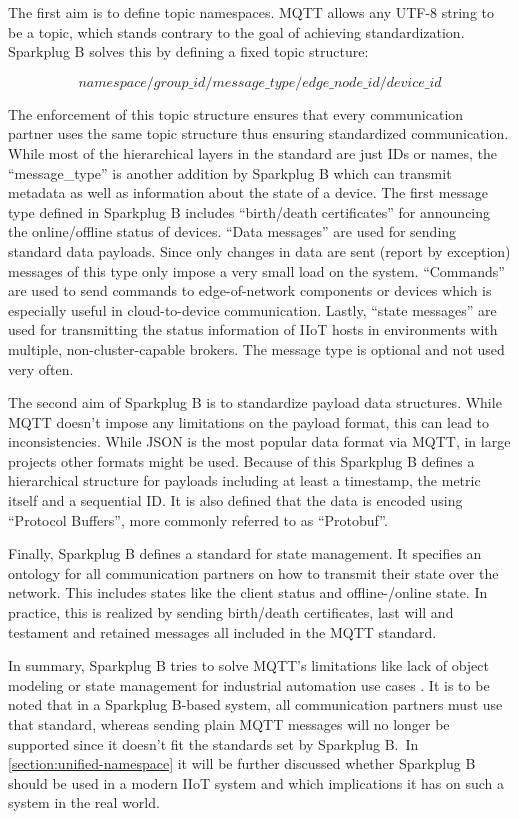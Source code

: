         The first aim is to define topic namespaces. MQTT allows any UTF-8 string to be a topic, which stands contrary to the goal of achieving standardization. Sparkplug B solves this by defining a fixed topic structure:
        
        \[
            namespace/group\_id/message\_type/edge\_node\_id/device\_id
        \]
            
        \noindent The enforcement of this topic structure ensures that every communication partner uses the same topic structure thus ensuring standardized communication. While most of the hierarchical layers in the standard are just IDs or names, the ``message\_type'' is another addition by Sparkplug B which can transmit metadata as well as information about the state of a device. The first message type defined in Sparkplug B includes ``birth/death certificates'' for announcing the online/offline status of devices. ``Data messages'' are used for sending standard data payloads. Since only changes in data are sent (report by exception) messages of this type only impose a very small load on the system. ``Commands'' are used to send commands to edge-of-network components or devices which is especially useful in cloud-to-device communication. Lastly, ``state messages'' are used for transmitting the status information of IIoT hosts in environments with multiple, non-cluster-capable brokers. The message type is optional and not used very often. 
        
        The second aim of Sparkplug B is to standardize payload data structures. While MQTT doesn't impose any limitations on the payload format, this can lead to inconsistencies. While JSON is the most popular data format via MQTT, in large projects other formats might be used. Because of this Sparkplug B defines a hierarchical structure for payloads including at least a timestamp, the metric itself and a sequential ID. It is also defined that the data is encoded using ``Protocol Buffers'', more commonly referred to as ``Protobuf''.
        
        Finally, Sparkplug B defines a standard for state management. It specifies an ontology for all communication partners on how to transmit their state over the network. This includes states like the client status and offline-/online state. In practice, this is realized by sending birth/death certificates, last will and testament and retained messages all included in the MQTT standard. \newline
        
        \noindent In summary, Sparkplug B tries to solve MQTT's limitations like lack of object modeling or state management for industrial automation use cases \cite{hivemq_opcua_vs_mqtt_sparkplug}. It is to be noted that in a Sparkplug B-based system, all communication partners must use that standard, whereas sending plain MQTT messages will no longer be supported since it doesn't fit the standards set by Sparkplug B.\ In \autoref{section:unified-namespace} it will be further discussed whether Sparkplug B should be used in a modern IIoT system and which implications it has on such a system in the real world.   